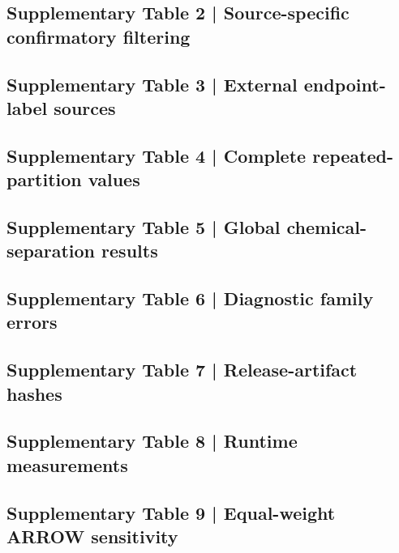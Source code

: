 \documentclass[10pt]{article}
\begin{document}
\subsection*{Supplementary Table 2 | Source-specific confirmatory filtering}
\small
\resizebox{\textwidth}{!}{}
\normalsize

\subsection*{Supplementary Table 3 | External endpoint-label sources}
\small

\normalsize

\subsection*{Supplementary Table 4 | Complete repeated-partition values}
\small

\normalsize

\subsection*{Supplementary Table 5 | Global chemical-separation results}
\small

\normalsize

\subsection*{Supplementary Table 6 | Diagnostic family errors}
\small

\normalsize

\subsection*{Supplementary Table 7 | Release-artifact hashes}
\scriptsize
\resizebox{\textwidth}{!}{}
\normalsize

\subsection*{Supplementary Table 8 | Runtime measurements}
\small

\normalsize

\subsection*{Supplementary Table 9 | Equal-weight ARROW sensitivity}
\small

\normalsize
\end{document}
